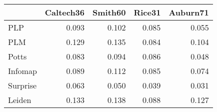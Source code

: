 \begin{tabular}{lrrrr}
\toprule
{} & Caltech36 & Smith60 & Rice31 & Auburn71 \\
\midrule
PLP      &     0.093 &   0.102 &  0.085 &    0.055 \\
PLM      &     0.129 &   0.135 &  0.084 &    0.104 \\
Potts    &     0.083 &   0.094 &  0.086 &    0.048 \\
Infomap  &     0.089 &   0.112 &  0.085 &    0.074 \\
Surprise &     0.063 &   0.050 &  0.039 &    0.031 \\
Leiden   &     0.133 &   0.138 &  0.088 &    0.127 \\
\bottomrule
\end{tabular}
